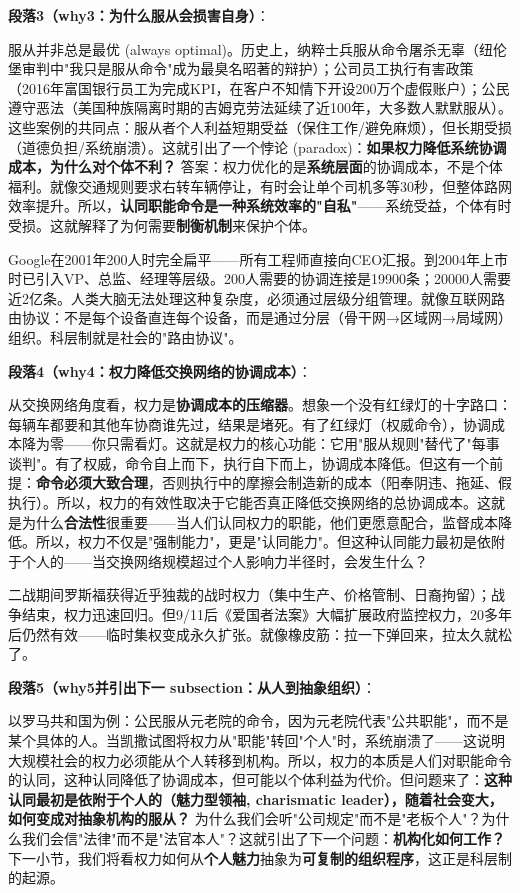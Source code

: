 \documentclass[../main.tex]{subfiles}
\begin{document}
	\textbf{段落3（why3：为什么服从会损害自身）}：  

	服从并非总是最优 (always optimal)。历史上，纳粹士兵服从命令屠杀无辜（纽伦堡审判中"我只是服从命令"成为最臭名昭著的辩护）；公司员工执行有害政策（2016年富国银行员工为完成KPI，在客户不知情下开设200万个虚假账户）；公民遵守恶法（美国种族隔离时期的吉姆克劳法延续了近100年，大多数人默默服从）。这些案例的共同点：服从者个人利益短期受益（保住工作/避免麻烦），但长期受损（道德负担/系统崩溃）。这就引出了一个悖论 (paradox)：\textbf{如果权力降低系统协调成本，为什么对个体不利？} 答案：权力优化的是\textbf{系统层面}的协调成本，不是个体福利。就像交通规则要求右转车辆停让，有时会让单个司机多等30秒，但整体路网效率提升。所以，\textbf{认同职能命令是一种系统效率的"自私"}——系统受益，个体有时受损。这就解释了为何需要\textbf{制衡机制}来保护个体。
	
	Google在2001年200人时完全扁平——所有工程师直接向CEO汇报。到2004年上市时已引入VP、总监、经理等层级。200人需要的协调连接是19900条；20000人需要近2亿条。人类大脑无法处理这种复杂度，必须通过层级分组管理。就像互联网路由协议：不是每个设备直连每个设备，而是通过分层（骨干网→区域网→局域网）组织。科层制就是社会的"路由协议"。

	\textbf{段落4（why4：权力降低交换网络的协调成本）}：  

	从交换网络角度看，权力是\textbf{协调成本的压缩器}。想象一个没有红绿灯的十字路口：每辆车都要和其他车协商谁先过，结果是堵死。有了红绿灯（权威命令），协调成本降为零——你只需看灯。这就是权力的核心功能：它用"服从规则"替代了"每事谈判"。有了权威，命令自上而下，执行自下而上，协调成本降低。但这有一个前提：\textbf{命令必须大致合理}，否则执行中的摩擦会制造新的成本（阳奉阴违、拖延、假执行）。所以，权力的有效性取决于它能否真正降低交换网络的总协调成本。这就是为什么\textbf{合法性}很重要——当人们认同权力的职能，他们更愿意配合，监督成本降低。所以，权力不仅是"强制能力"，更是"认同能力"。但这种认同能力最初是依附于个人的——当交换网络规模超过个人影响力半径时，会发生什么？
	
	二战期间罗斯福获得近乎独裁的战时权力（集中生产、价格管制、日裔拘留）；战争结束，权力迅速回归。但9/11后《爱国者法案》大幅扩展政府监控权力，20多年后仍然有效——临时集权变成永久扩张。就像橡皮筋：拉一下弹回来，拉太久就松了。

	\textbf{段落5（why5并引出下一 subsection：从人到抽象组织）}：  

	以罗马共和国为例：公民服从元老院的命令，因为元老院代表"公共职能"，而不是某个具体的人。当凯撒试图将权力从"职能"转回"个人"时，系统崩溃了——这说明大规模社会的权力必须能从个人转移到机构。所以，权力的本质是人们对职能命令的认同，这种认同降低了协调成本，但可能以个体利益为代价。但问题来了：\textbf{这种认同最初是依附于个人的（魅力型领袖, charismatic leader），随着社会变大，如何变成对抽象机构的服从？} 为什么我们会听"公司规定"而不是"老板个人"？为什么我们会信"法律"而不是"法官本人"？这就引出了下一个问题：\textbf{机构化如何工作？} 下一小节，我们将看权力如何从\textbf{个人魅力}抽象为\textbf{可复制的组织程序}，这正是科层制的起源。
	
\end{document}
